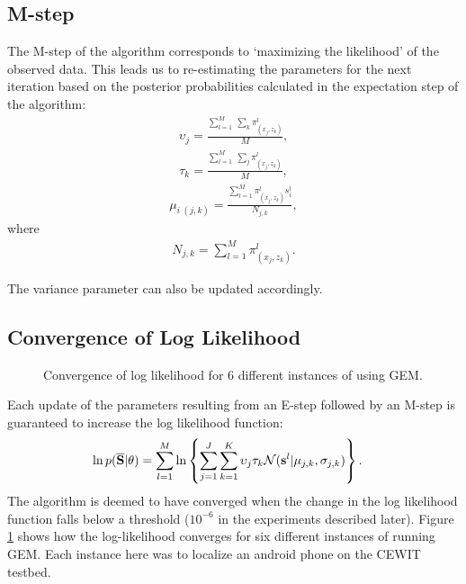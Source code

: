 \subsection{M-step}
\label{subsec:mstep}

The M-step of the algorithm corresponds to `maximizing the likelihood' of
the observed data. This leads us to re-estimating the parameters for the next iteration based on the posterior probabilities calculated in the expectation step of the algorithm:
\begin{align}
\upsilon_{j} = \frac { \sum_{l=1}^{M} \ \sum_{k} \pi_{({x_{j}}, {z_{k}})}^{l}} {M},
\end{align}
\begin{align}
\tau_{k} = \frac { \sum_{l=1}^{M} \ \sum_{j} \pi_{({x_{j}}, {z_{k}})}^{l}} {M},
\end{align}
\begin{align}
\mu_{i \ (j,k)} = \frac  { \sum_{l=1}^{M} \pi_{({x_{j}}, {z_{k}})}^{l} s_{i}^{l}} {N_{j,k}},
\end{align}
where
\begin{align}
{N_{j,k}} = \sum_{l=1}^{M} \pi_{({x_{j}}, {z_{k}})}^{l}.
\end{align}

The variance parameter can also be updated accordingly.

\subsection{Convergence of Log Likelihood}
\label{subsec:convergenceofloglikelihood}

\begin{figure}
\centering
{}
\caption{Convergence of log likelihood for 6 different instances of using GEM.}
\label{fig:loglikelihood}
\end{figure}

Each update of the parameters resulting from an E-step followed by an
M-step is guaranteed to increase the log likelihood function:
\begin{align}
\ln p({\bf \overline{S}} | {\bf \theta}) &= \sum_{l=1}^{M} \ln \left\{
\sum_{j=1}^J \sum_{k=1}^K \upsilon_{j} \tau_{k} \mathcal N ({{\bf {s}}^{l}} | {{\bf {\mu}}_{j,k}}, {{\bf \sigma}_{j,k}})\right\}.
\end{align}
The algorithm is deemed to have converged when the change in the log likelihood function falls below a threshold ($10^{-6}$ in the experiments described later).
Figure \ref{fig:loglikelihood} shows how the log-likelihood converges for six different instances of running GEM. Each instance here was to localize an android phone on the CEWIT testbed.



